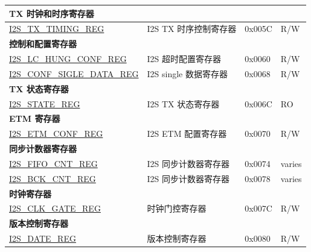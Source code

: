 \begin{longtable}{ | p{5.5cm} | p{7cm} | p{1.3cm} | p{2cm} | }
\multicolumn{4}{|l|}{\textbf{TX 时钟和时序寄存器}} \\ \hline
\hyperref[regdesc:I2STXTIMINGREG]{I2S\_TX\_TIMING\_REG} & I2S TX 时序控制寄存器 & 0x005C & R/W \\ \hline
\multicolumn{4}{|l|}{\textbf{控制和配置寄存器}} \\ \hline
\hyperref[regdesc:I2SLCHUNGCONFREG]{I2S\_LC\_HUNG\_CONF\_REG} & I2S 超时配置寄存器 & 0x0060 & R/W \\ \hline
\hyperref[regdesc:I2SCONFSIGLEDATAREG]{I2S\_CONF\_SIGLE\_DATA\_REG} & I2S single 数据寄存器 & 0x0068 & R/W \\ \hline
\multicolumn{4}{|l|}{\textbf{TX 状态寄存器}} \\ \hline
\hyperref[regdesc:I2SSTATEREG]{I2S\_STATE\_REG} & I2S TX 状态寄存器 & 0x006C & RO \\ \hline
\multicolumn{4}{|l|}{\textbf{ETM 寄存器}} \\ \hline
\hyperref[regdesc:I2SETMCONFREG]{I2S\_ETM\_CONF\_REG} & I2S ETM 配置寄存器 & 0x0070 & R/W \\ \hline
\multicolumn{4}{|l|}{\textbf{同步计数器寄存器}} \\ \hline
\hyperref[regdesc:I2SFIFOCNTREG]{I2S\_FIFO\_CNT\_REG} & I2S 同步计数器寄存器 & 0x0074 & varies \\ \hline
\hyperref[regdesc:I2SBCKCNTREG]{I2S\_BCK\_CNT\_REG} & I2S 同步计数器寄存器 & 0x0078 & varies \\ \hline
\multicolumn{4}{|l|}{\textbf{时钟寄存器}} \\ \hline
\hyperref[regdesc:I2SCLKGATEREG]{I2S\_CLK\_GATE\_REG} & 时钟门控寄存器 & 0x007C & R/W \\ \hline
\multicolumn{4}{|l|}{\textbf{版本控制寄存器}} \\ \hline
\hyperref[regdesc:I2SDATEREG]{I2S\_DATE\_REG} & 版本控制寄存器 & 0x0080 & R/W \\ \hline
\end{longtable}
